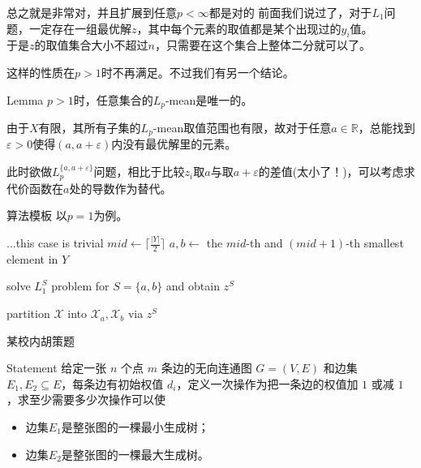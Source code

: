 \documentclass{beamer}
\begin{document}
\begin{frame}[fragile]{总之就是非常对，并且扩展到任意$p < \infty$都是对的}
	前面我们说过了，对于$L_1$问题，一定存在一组最优解$z$，其中每个元素的取值都是某个出现过的$y_i$值。\\
	
	于是$z$的取值集合大小不超过$n$，只需要在这个集合上整体二分就可以了。\\\pause
	
	这样的性质在$p > 1$时不再满足。\pause 不过我们有另一个结论。
	
	\begin{block}{Lemma}
		$p > 1$时，任意集合的$L_p$-mean是唯一的。
	\end{block}\pause
	
	由于$X$有限，其所有子集的$L_p$-mean取值范围也有限，故对于任意$a \in \mathbb R$，总能找到$\varepsilon > 0$使得$(a, a + \varepsilon)$内没有最优解里的元素。\\\pause
	
	此时欲做$L_p^{\{a, a + \varepsilon\}}$问题，相比于比较$z_i$取$a$与取$a + \varepsilon$的差值(太小了！)，可以考虑求代价函数在$a$处的导数作为替代。
	
\end{frame}
\begin{frame}{算法模板}
	以$p = 1$为例。\\
	
	\begin{algorithmic}[1]
				\State ...this case is trivial
			\Else
				\State $mid \gets \lceil \frac{|Y|}{2} \rceil$
				\State $a, b \gets $ the $mid$-th and $(mid+1)$-th smallest element in $Y$
				
				\State solve $L_1^S$ problem for $S = \{a, b\}$ and obtain $z^S$ 
				
				\State partition $\mathcal X$ into $\mathcal X_a, \mathcal X_b$ via $z^S$
				
				\State {}
				
				\State {}
				
			\EndIf
		\EndFunction
	\end{algorithmic}
	
\end{frame}

\begin{frame}{某校内胡策题}
	\begin{block}{Statement}
		给定一张 $n$ 个点 $m$ 条边的无向连通图 $G = (V, E)$ 和边集 $E_1, E_2 \subseteq E$，每条边有初始权值 $d_i$，定义一次操作为把一条边的权值加 $1$ 或减 $1$ ，求至少需要多少次操作可以使
		\begin{itemize}
			\item 边集$E_1$是整张图的一棵最小生成树；
			\item 边集$E_2$是整张图的一棵最大生成树。
		\end{itemize}
	\end{block}
\end{frame}
\end{document}

